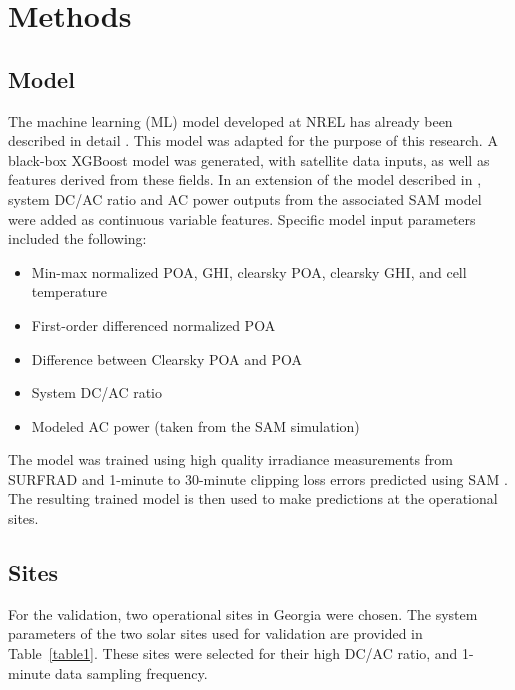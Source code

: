 \documentclass[conference]{IEEEtran}
\begin{document}
\section{Methods}

\subsection{Model}

The machine learning (ML) model developed at NREL has already been described in detail \cite{Anderson2020}. This model was adapted for the purpose of this research. A black-box XGBoost model was generated, with satellite data inputs, as well as features derived from these fields. In an extension of the model described in \cite{Anderson2020}, system DC/AC ratio and AC power outputs from the associated SAM model were added as continuous variable features. Specific model input parameters included the following:
\begin{itemize}
\item Min-max normalized POA, GHI, clearsky POA, clearsky GHI, and cell temperature
\item First-order differenced normalized POA
\item Difference between Clearsky POA and POA
\item System DC/AC ratio
\item Modeled AC power (taken from the SAM simulation) 
\end{itemize}
The model was trained using high quality irradiance measurements from SURFRAD \cite{Augustine2000} and 1-minute to 30-minute clipping loss errors predicted using SAM \cite{Freeman2018}. The resulting trained model is then used to make predictions at the operational sites.




\subsection{Sites}


For the validation, two operational sites in Georgia were chosen. The system parameters of the two solar sites used for validation are provided in Table~\ref{table1}. These sites were selected for their high DC/AC ratio, and 1-minute data sampling frequency.
\end{document}
